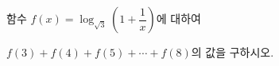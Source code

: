 함수 $f(x)=\log_{\sqrt{3}}\left(1+\dfrac{1}{x}\right)$에 대하여\par\noindent $f(3)+f(4)+f(5)+\cdots+f(8)$의 값을 구하시오.

